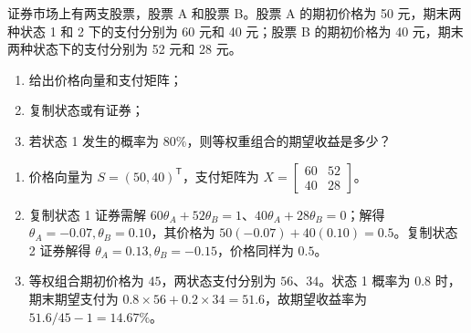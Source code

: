 \begin{problem}
 证券市场上有两支股票，股票 A 和股票 B。股票 A 的期初价格为 \num{50} 元，期末两种状态 1 和 2 下的支付分别为 \num{60} 元和 \num{40} 元；股票 B 的期初价格为 \num{40} 元，期末两种状态下的支付分别为 \num{52} 元和 \num{28} 元。
\begin{enumerate}[label=(\alph*)]
    \item 给出价格向量和支付矩阵；
    \item 复制状态或有证券；
    \item 若状态 1 发生的概率为 $80\%$，则等权重组合的期望收益是多少？
\end{enumerate}
\end{problem}
\begin{solution}
\begin{enumerate}[label=(\alph*)]
\item 价格向量为 $S=(50,40)^{\mathsf T}$，支付矩阵为 $X=\begin{bmatrix}60&52\\40&28\end{bmatrix}$。
\item 复制状态 1 证券需解 $60\theta_A+52\theta_B=1$、$40\theta_A+28\theta_B=0$；解得 $\theta_A=-0.07,\theta_B=0.10$，其价格为 $50(-0.07)+40(0.10)=0.5$。复制状态 2 证券解得 $\theta_A=0.13,\theta_B=-0.15$，价格同样为 $0.5$。
\item 等权组合期初价格为 $45$，两状态支付分别为 $56$、$34$。状态 1 概率为 $0.8$ 时，期末期望支付为 $0.8\times56+0.2\times34=51.6$，故期望收益率为 $51.6/45-1=14.67\%$。
\end{enumerate}
\end{solution}
